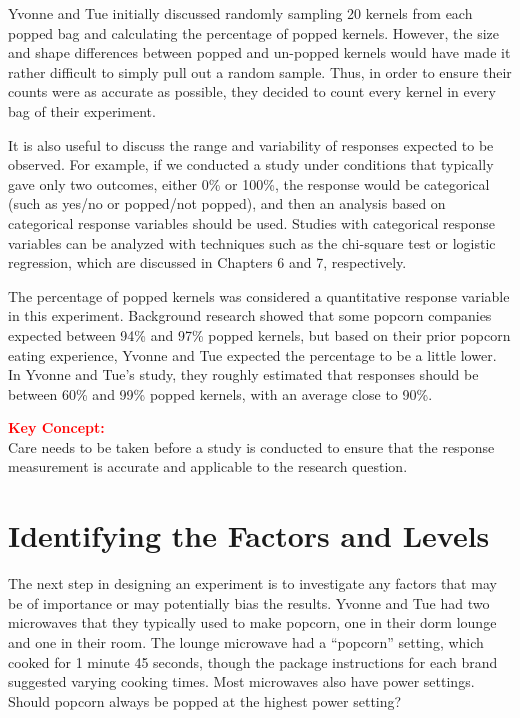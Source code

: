 \documentclass[
]{report}
\begin{document}
Yvonne and Tue initially discussed randomly sampling 20 kernels from each popped bag and calculating the percentage of popped kernels. However, the size and shape differences between popped and un-popped kernels would have made it rather difficult to simply pull out a random sample. Thus, in order to ensure their counts were as accurate as possible, they decided to count every kernel in every bag of their experiment.

It is also useful to discuss the range and variability of responses expected to be observed. For example, if we conducted a study under conditions that typically gave only two outcomes, either 0\% or 100\%, the response would be categorical (such as yes/no or popped/not popped), and then an analysis based on categorical response variables should be used. Studies with categorical response variables can be analyzed with techniques such as the chi-square test or logistic regression, which are discussed in Chapters 6 and 7, respectively.

The percentage of popped kernels was considered a quantitative response variable in this experiment. Background research showed that some popcorn companies expected between 94\% and 97\% popped kernels, but based on their prior popcorn eating experience, Yvonne and Tue expected the percentage to be a little lower. In Yvonne and Tue's study, they roughly estimated that responses should be between 60\% and 99\% popped kernels, with an average close to 90\%.

\large

\textbf{\textcolor{red}{Key Concept:}}\\
\color{red}
Care needs to be taken before a study is conducted to ensure that the response measurement is accurate and applicable to the research question.\\
\color{black}
\normalsize

\section{\texorpdfstring{\textbf{Identifying the Factors and Levels}}{Identifying the Factors and Levels}}\label{identifying-the-factors-and-levels}

The next step in designing an experiment is to investigate any factors that may be of importance or may potentially bias the results. Yvonne and Tue had two microwaves that they typically used to make popcorn, one in their dorm lounge and one in their room. The lounge microwave had a ``popcorn'' setting, which cooked for 1 minute 45 seconds, though the package instructions for each brand suggested varying cooking times. Most microwaves also have power settings. Should popcorn always be popped at the highest power setting?
\end{document}
